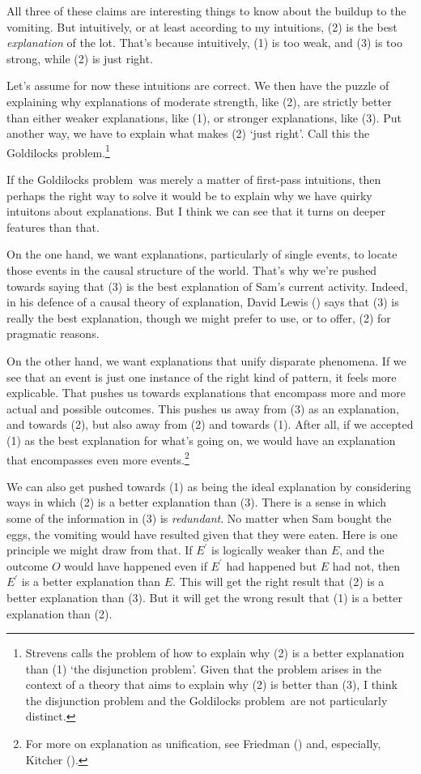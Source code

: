 \documentclass[
  11pt,
  letterpaper,
  DIV=11,
  numbers=noendperiod,
  twoside]{scrartcl}
\begin{document}
All three of these claims are interesting things to know about the
buildup to the vomiting. But intuitively, or at least according to my
intuitions, (2) is the best \emph{explanation} of the lot. That's
because intuitively, (1) is too weak, and (3) is too strong, while (2)
is just right.

Let's assume for now these intuitions are correct. We then have the
puzzle of explaining why explanations of moderate strength, like (2),
are strictly better than either weaker explanations, like (1), or
stronger explanations, like (3). Put another way, we have to explain
what makes (2) `just right'. Call this the Goldilocks
problem.\footnote{Strevens calls the problem of how to explain why (2)
  is a better explanation than (1) `the disjunction problem'. Given that
  the problem arises in the context of a theory that aims to explain why
  (2) is better than (3), I think the disjunction problem and the
  Goldilocks problem~are not particularly distinct.}

If the Goldilocks problem~was merely a matter of first-pass intuitions,
then perhaps the right way to solve it would be to explain why we have
quirky intuitons about explanations. But I think we can see that it
turns on deeper features than that.

On the one hand, we want explanations, particularly of single events, to
locate those events in the causal structure of the world. That's why
we're pushed towards saying that (3) is the best explanation of Sam's
current activity. Indeed, in his defence of a causal theory of
explanation, David Lewis () says that (3)
is really the best explanation, though we might prefer to use, or to
offer, (2) for pragmatic reasons.

On the other hand, we want explanations that unify disparate phenomena.
If we see that an event is just one instance of the right kind of
pattern, it feels more explicable. That pushes us towards explanations
that encompass more and more actual and possible outcomes. This pushes
us away from (3) as an explanation, and towards (2), but also away from
(2) and towards (1). After all, if we accepted (1) as the best
explanation for what's going on, we would have an explanation that
encompasses even more events.\footnote{For more on explanation as
  unification, see Friedman () and,
  especially, Kitcher ().}

We can also get pushed towards (1) as being the ideal explanation by
considering ways in which (2) is a better explanation than (3). There is
a sense in which some of the information in (3) is \emph{redundant}. No
matter when Sam bought the eggs, the vomiting would have resulted given
that they were eaten. Here is one principle we might draw from that. If
\(E^\prime\) is logically weaker than \(E\), and the outcome \(O\) would
have happened even if \(E^\prime\) had happened but \(E\) had not, then
\(E^\prime\) is a better explanation than \(E\). This will get the right
result that (2) is a better explanation than (3). But it will get the
wrong result that (1) is a better explanation than (2).
\end{document}
